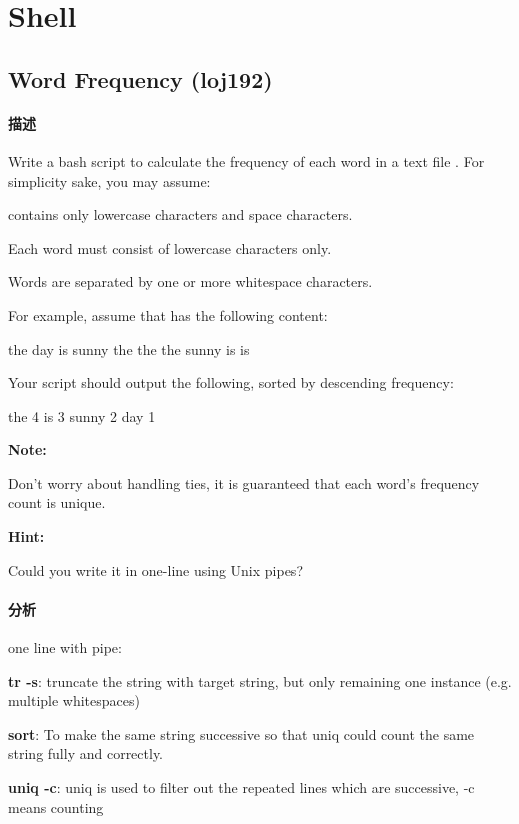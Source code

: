 \chapter{Shell}

\section{Word Frequency (loj192)} %
\label{sec:word-frequency}


\subsubsection{描述}
Write a bash script to calculate the frequency of each word in a text file .
For simplicity sake, you may assume:
\begindot
\item {} contains only lowercase characters and space  characters.
\item Each word must consist of lowercase characters only.
\item Words are separated by one or more whitespace characters.
\myenddot

For example, assume that  has the following content:
\begin{Code}
the day is sunny the the
the sunny is is
\end{Code}

Your script should output the following, sorted by descending frequency:
\begin{Code}
the 4
is 3
sunny 2
day 1
\end{Code}

\textbf{Note:}

Don't worry about handling ties, it is guaranteed that each word's frequency count is unique.

\textbf{Hint:}

Could you write it in one-line using Unix pipes?

\subsubsection{分析}
one line with pipe:

\textbf{tr -s}: truncate the string with target string, but only remaining one instance (e.g. multiple whitespaces)

\textbf{sort}: To make the same string successive so that uniq could count the same string fully and correctly.

\textbf{uniq -c}: uniq is used to filter out the repeated lines which are successive, -c means counting

